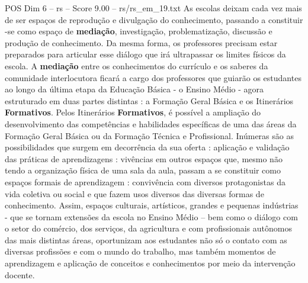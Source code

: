 \begin{textsample}{POS Dim 6 – rs – Score 9.00 – rs/rs\_em\_19.txt}
As escolas deixam cada vez mais de ser espaços de reprodução e divulgação do conhecimento, passando a constituir -se como espaço de \textbf{mediação}, investigação, problematização, discussão e produção de conhecimento.
Da mesma forma, os professores precisam estar preparados para articular esse diálogo que irá ultrapassar os limites físicos da escola.
A \textbf{mediação} entre os conhecimentos do currículo e os saberes da comunidade interlocutora ficará a cargo dos professores que guiarão os estudantes ao longo da última etapa da Educação Básica - o Ensino Médio - agora estruturado em duas partes distintas : a Formação Geral Básica e os Itinerários \textbf{Formativos}.
Pelos Itinerários \textbf{Formativos}, é possível a ampliação do desenvolvimento das competências e habilidades específicas de uma das áreas da Formação Geral Básica ou da Formação Técnica e Profissional.
Inúmeras são as possibilidades que surgem em decorrência da sua oferta : aplicação e validação das práticas de aprendizagens : vivências em outros espaços que, mesmo não tendo a organização física de uma sala da aula, passam a se constituir como espaços formais de aprendizagem : convivência com diversos protagonistas da vida coletiva ou social e que fazem usos diversos das diversas formas de conhecimento.
Assim, espaços culturais, artísticos, grandes e pequenas indústrias - que se tornam extensões da escola no Ensino Médio – bem como o diálogo com o setor do comércio, dos serviços, da agricultura e com profissionais autônomos das mais distintas áreas, oportunizam aos estudantes não só o contato com as diversas profissões e com o mundo do trabalho, mas também momentos de aprendizagem e aplicação de conceitos e conhecimentos por meio da intervenção docente.

\end{textsample}
